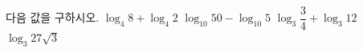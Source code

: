 다음 값을 구하시오.
 $\log_4 8+\log_4 2$
 $\log_{10} 50-\log_{10} 5$
 $\log_3 \dfrac{3}{4}+\log_3 12$
 $\log_3 27\sqrt{3}$
